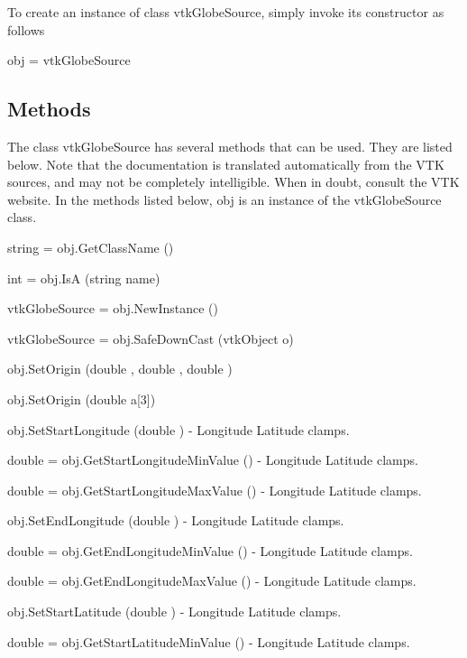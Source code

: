 To create an instance of class vtk\-Globe\-Source, simply invoke its constructor as follows \begin{DoxyVerb}  obj = vtkGlobeSource
\end{DoxyVerb}
 \hypertarget{vtkwidgets_vtkxyplotwidget_Methods}{}\subsection{Methods}\label{vtkwidgets_vtkxyplotwidget_Methods}
The class vtk\-Globe\-Source has several methods that can be used. They are listed below. Note that the documentation is translated automatically from the V\-T\-K sources, and may not be completely intelligible. When in doubt, consult the V\-T\-K website. In the methods listed below, {\ttfamily obj} is an instance of the vtk\-Globe\-Source class. 
\begin{DoxyItemize}
\item {\ttfamily string = obj.\-Get\-Class\-Name ()}  
\item {\ttfamily int = obj.\-Is\-A (string name)}  
\item {\ttfamily vtk\-Globe\-Source = obj.\-New\-Instance ()}  
\item {\ttfamily vtk\-Globe\-Source = obj.\-Safe\-Down\-Cast (vtk\-Object o)}  
\item {\ttfamily obj.\-Set\-Origin (double , double , double )}  
\item {\ttfamily obj.\-Set\-Origin (double a\mbox{[}3\mbox{]})}  
\item {\ttfamily obj.\-Set\-Start\-Longitude (double )} -\/ Longitude Latitude clamps.  
\item {\ttfamily double = obj.\-Get\-Start\-Longitude\-Min\-Value ()} -\/ Longitude Latitude clamps.  
\item {\ttfamily double = obj.\-Get\-Start\-Longitude\-Max\-Value ()} -\/ Longitude Latitude clamps.  
\item {\ttfamily obj.\-Set\-End\-Longitude (double )} -\/ Longitude Latitude clamps.  
\item {\ttfamily double = obj.\-Get\-End\-Longitude\-Min\-Value ()} -\/ Longitude Latitude clamps.  
\item {\ttfamily double = obj.\-Get\-End\-Longitude\-Max\-Value ()} -\/ Longitude Latitude clamps.  
\item {\ttfamily obj.\-Set\-Start\-Latitude (double )} -\/ Longitude Latitude clamps.  
\item {\ttfamily double = obj.\-Get\-Start\-Latitude\-Min\-Value ()} -\/ Longitude Latitude clamps.  

\end{DoxyItemize}

